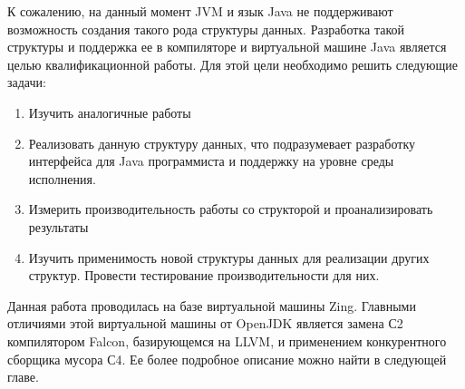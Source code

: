 К сожалению, на данный момент JVM и язык Java не поддерживают возможность создания такого рода структуры данных. Разработка такой структуры и поддержка ее в компиляторе и виртуальной машине Java является целью квалификационной работы. Для этой цели необходимо решить следующие задачи: 
\begin{enumerate}
	\item Изучить аналогичные работы
	\item Реализовать данную структуру данных, что подразумевает разработку интерфейса для Java программиста и поддержку на уровне среды исполнения.
	\item Измерить производительность работы со структорой и проанализировать результаты
	\item Изучить применимость новой структуры данных для реализации других структур. Провести тестирование производительности для них.
\end{enumerate}
Данная работа проводилась на базе виртуальной машины Zing. Главными отличиями этой виртуальной машины от OpenJDK является замена С2 компилятором Falcon, базирующемся на LLVM, и применением конкурентного сборщика мусора С4\cite{C4collector}. Ее более подробное описание можно найти в следующей главе.
\clearpage
